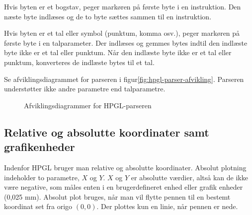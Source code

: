 Hvis byten er et bogstav, peger markøren på første byte i en
instruktion. Den næste byte indlæses og de to byte sættes sammen til
en instruktion.

Hvis byten er et tal eller symbol (punktum, komma osv.), peger
markøren på første byte i en talparameter. Der indlæses og gemmes
bytes indtil den indlæste byte ikke er et tal eller punktum. Når den
indlæste byte ikke er et tal eller punktum, konverteres de indlæste
bytes til et tal.

Se afviklingsdiagrammet for parseren i
figur\vref{fig:hpgl-parser-afvikling}. Parseren understøtter ikke
andre parametre end talparametre.

\begin{figure}[htbp]
  \centering
  \qquad
  \caption{Afviklingsdiagrammer for HPGL-parseren}
  \label{fig:hpgl-parser-afvikling}
\end{figure}


\subsection{Relative og absolutte koordinater samt grafikenheder}
\label{sc:relativ-absolut}

Indenfor HPGL bruger man relative og absolutte koordinater. Absolut
plotning indeholder to parametre, $X$ og $Y$. $X$ og $Y$ er absolutte
værdier, altså kan de ikke være negative, som måles enten i en
brugerdefineret enhed eller grafik enheder (0,025 mm). Absolut plot
bruges, når man vil flytte pennen til en bestemt koordinat set fra
origo $(0, 0)$. Der plottes kun en linie, når pennen er nede.


